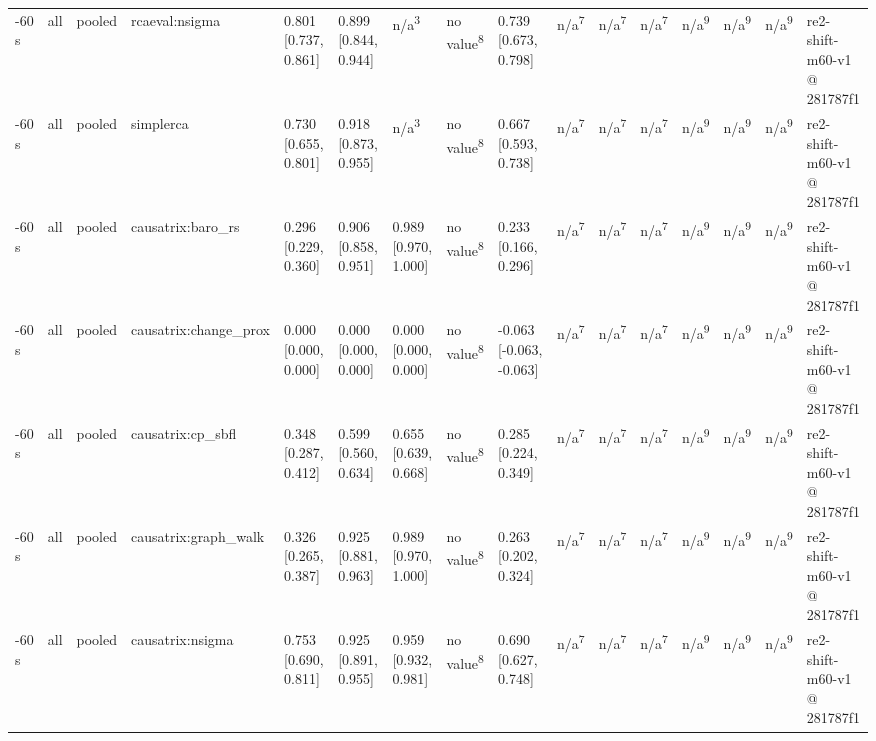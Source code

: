 \begin{table}[t]
\begin{tabular}{llllllllllllllll}
-60 s & all & pooled & rcaeval:nsigma & 0.801 [0.737, 0.861] & 0.899 [0.844, 0.944] & n/a\textsuperscript{3} & no value\textsuperscript{8} & 0.739 [0.673, 0.798] & n/a\textsuperscript{7} & n/a\textsuperscript{7} & n/a\textsuperscript{7} & n/a\textsuperscript{9} & n/a\textsuperscript{9} & n/a\textsuperscript{9} & re2-shift-m60-v1 @ 281787f1 \\
-60 s & all & pooled & simplerca & 0.730 [0.655, 0.801] & 0.918 [0.873, 0.955] & n/a\textsuperscript{3} & no value\textsuperscript{8} & 0.667 [0.593, 0.738] & n/a\textsuperscript{7} & n/a\textsuperscript{7} & n/a\textsuperscript{7} & n/a\textsuperscript{9} & n/a\textsuperscript{9} & n/a\textsuperscript{9} & re2-shift-m60-v1 @ 281787f1 \\
-60 s & all & pooled & causatrix:baro\_rs & 0.296 [0.229, 0.360] & 0.906 [0.858, 0.951] & 0.989 [0.970, 1.000] & no value\textsuperscript{8} & 0.233 [0.166, 0.296] & n/a\textsuperscript{7} & n/a\textsuperscript{7} & n/a\textsuperscript{7} & n/a\textsuperscript{9} & n/a\textsuperscript{9} & n/a\textsuperscript{9} & re2-shift-m60-v1 @ 281787f1 \\
-60 s & all & pooled & causatrix:change\_prox & 0.000 [0.000, 0.000] & 0.000 [0.000, 0.000] & 0.000 [0.000, 0.000] & no value\textsuperscript{8} & -0.063 [-0.063, -0.063] & n/a\textsuperscript{7} & n/a\textsuperscript{7} & n/a\textsuperscript{7} & n/a\textsuperscript{9} & n/a\textsuperscript{9} & n/a\textsuperscript{9} & re2-shift-m60-v1 @ 281787f1 \\
-60 s & all & pooled & causatrix:cp\_sbfl & 0.348 [0.287, 0.412] & 0.599 [0.560, 0.634] & 0.655 [0.639, 0.668] & no value\textsuperscript{8} & 0.285 [0.224, 0.349] & n/a\textsuperscript{7} & n/a\textsuperscript{7} & n/a\textsuperscript{7} & n/a\textsuperscript{9} & n/a\textsuperscript{9} & n/a\textsuperscript{9} & re2-shift-m60-v1 @ 281787f1 \\
-60 s & all & pooled & causatrix:graph\_walk & 0.326 [0.265, 0.387] & 0.925 [0.881, 0.963] & 0.989 [0.970, 1.000] & no value\textsuperscript{8} & 0.263 [0.202, 0.324] & n/a\textsuperscript{7} & n/a\textsuperscript{7} & n/a\textsuperscript{7} & n/a\textsuperscript{9} & n/a\textsuperscript{9} & n/a\textsuperscript{9} & re2-shift-m60-v1 @ 281787f1 \\
-60 s & all & pooled & causatrix:nsigma & 0.753 [0.690, 0.811] & 0.925 [0.891, 0.955] & 0.959 [0.932, 0.981] & no value\textsuperscript{8} & 0.690 [0.627, 0.748] & n/a\textsuperscript{7} & n/a\textsuperscript{7} & n/a\textsuperscript{7} & n/a\textsuperscript{9} & n/a\textsuperscript{9} & n/a\textsuperscript{9} & re2-shift-m60-v1 @ 281787f1 \\

\end{tabular}
\end{table}
